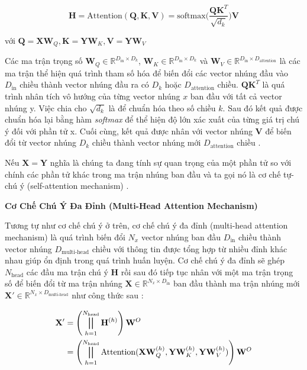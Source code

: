 \begin{equation}
\label{attention}
\mathbf{H} = \text{Attention}(\mathbf{Q}, \mathbf{K}, \mathbf{V}) = \text{softmax}\Big(\frac{\mathbf{Q}\mathbf{K}^T}{\sqrt{d_k}}\Big) \mathbf{V}
\end{equation}

với  $\mathbf{Q} = \mathbf{X}\mathbf{W}_Q, \mathbf{K} = \mathbf{Y} \mathbf{W}_K, \mathbf{V} = \mathbf{Y} \mathbf{W}_V$

Các ma trận trọng số 
$\mathbf{W}_Q \in \mathbb{R}^{D_{\text{in}} \times D_{k}}$, 
$\mathbf{W}_K \in \mathbb{R}^{D_{\text{in}} \times D_{k}}$ và 
$\mathbf{W}_V \in \mathbb{R}^{D_{\text{in}} \times D_{\text{attention}}}$ là các ma trận thể hiện quá trình tham số hóa để biến đổi các vector nhúng đầu vào $D_{\text{in}}$ chiều thành vector nhúng đầu ra có $D_{k}$ hoặc $D_{\text{attention}}$ chiều. $\mathbf{Q}\mathbf{K}^T$ là quá trình nhân tích vô hướng của từng vector nhúng $x$ ban đầu với tất cả vector nhúng y. Việc chia cho $\sqrt{d_k}$ là để chuẩn hóa theo số chiều $k$. Sau đó kết quả được chuẩn hóa lại bằng hàm \textit{softmax} để thể hiện độ lớn xác xuất của từng giá trị chú ý đối với phần tử x. Cuối cùng, kết quả được nhân với vector nhúng $\mathbf{V}$ để biến đổi từ vector nhúng $D_{k}$ chiều thành vector nhúng mới  $D_{\text{attention}}$ chiều .

Nếu $\mathbf{X} = \mathbf{Y}$ nghĩa là chúng ta đang tính sự quan trọng của một phần tử so với chính các phần tử khác trong ma trận nhúng ban đầu và ta gọi nó là cơ chế tự-chú ý (self-attention mechanism) .

\textbf{Cơ Chế Chú Ý Đa Đỉnh (Multi-Head Attention Mechanism)}

Tương tự như cơ chế chú ý ở trên, cơ chế chú ý đa đỉnh (multi-head attention mechanism) là quá trình biến đổi $N_x$ vector nhúng ban đầu $D_{\text{in}}$ chiều thành vector nhúng $D_{\text{multi-head}}$ chiều với thông tin được tổng hợp từ nhiều đỉnh khác nhau giúp ổn định trong quá trình huấn luyện. Cơ chế chú ý đa đỉnh sẽ ghép $N_{\text{head}}$ các đầu ma trận chú ý $\mathbf{H}$ rồi sau đó tiếp tục nhân với một ma trận trọng số để biến đổi từ ma trận nhúng $\mathbf{X} \in \mathbb{R}^{N_x \times D_\text{in}}$ ban đầu thành ma trận nhúng mới $\mathbf{X}' \in \mathbb{R}^{N_x \times D_{\text{multi-head}}}$ như công thức sau :

\begin{equation}
\label{headAttention}
\begin{split}
\mathbf{X}'& =\left(\bigparallel_{h=1}^{N_{\text{head}}}\mathbf{H}^{(h)}\right)\mathbf{W}^{O} \\
& = \left(\bigparallel_{h=1}^{N_{\text{head}}} \text{Attention}(\mathbf{X} \mathbf{W}_Q^{(h)}, \mathbf{Y} \mathbf{W}_K^{(h)}, \mathbf{Y} \mathbf{W}_V^{(h)}) \right)\mathbf{W}^{O}
\end{split}
\end{equation}

